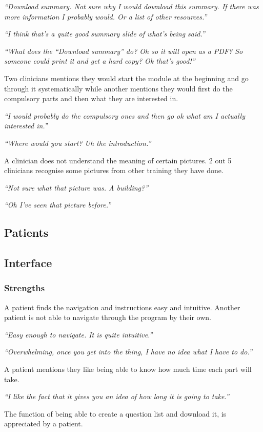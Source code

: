 \documentclass{sigchi}
\begin{document}
\textit{“Download summary. Not sure why I would download this summary. If there was more information I probably would. Or a list of other resources.”}

\textit{“I think that’s a quite good summary slide of what’s being said.”}

\textit{“What does the “Download summary” do? Oh so it will open as a PDF? So someone could print it and get a hard copy? Ok that’s good!”}

Two clinicians mentions they would start the module at the beginning and go through it systematically while another mentions they would first do the compulsory parts and then what they are interested in.

\textit{“I would probably do the compulsory ones and then go ok what am I actually interested in.”}

\textit{“Where would you start? Uh the introduction.”}

A clinician does not understand the meaning of certain pictures. 2 out 5 clinicians recognise some pictures from other training they have done.

\textit{“Not sure what that picture was. A building?”}

\textit{“Oh I’ve seen that picture before.”}

\subsection{Patients}

\subsection{Interface}
\subsubsection{Strengths}
A patient finds the navigation and instructions easy and intuitive. Another patient is not able to navigate through the program by their own.

\textit{“Easy enough to navigate. It is quite intuitive.”}

\textit{“Overwhelming, once you get into the thing, I have no idea what I have to do.”}

A patient mentions they like being able to know how much time each part will take.

\textit{“I like the fact that it gives you an idea of how long it is going to take.”}

The function of being able to create a question list and download it, is appreciated by a patient.
\end{document}
